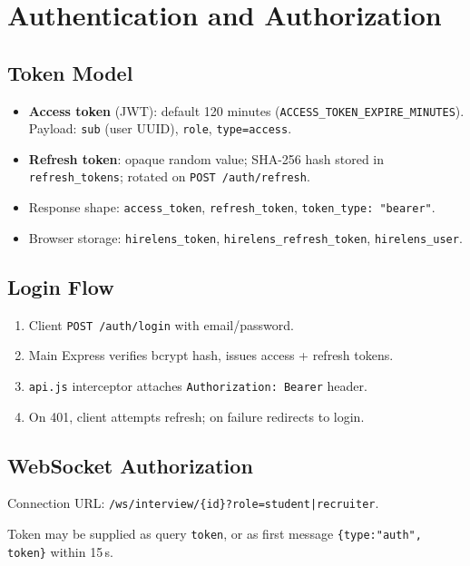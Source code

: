 \documentclass[11pt,a4paper]{report}
\begin{document}
\chapter{Authentication and Authorization}

\section{Token Model}
\begin{itemize}
  \item \textbf{Access token} (JWT): default 120 minutes (\texttt{ACCESS\_TOKEN\_EXPIRE\_MINUTES}). Payload: \texttt{sub} (user UUID), \texttt{role}, \texttt{type=access}.
  \item \textbf{Refresh token}: opaque random value; SHA-256 hash stored in \texttt{refresh\_tokens}; rotated on \texttt{POST /auth/refresh}.
  \item Response shape: \texttt{access\_token}, \texttt{refresh\_token}, \texttt{token\_type: "bearer"}.
  \item Browser storage: \texttt{hirelens\_token}, \texttt{hirelens\_refresh\_token}, \texttt{hirelens\_user}.
\end{itemize}

\section{Login Flow}
\begin{enumerate}
  \item Client \texttt{POST /auth/login} with email/password.
  \item Main Express verifies bcrypt hash, issues access + refresh tokens.
  \item \texttt{api.js} interceptor attaches \texttt{Authorization: Bearer} header.
  \item On 401, client attempts refresh; on failure redirects to login.
\end{enumerate}

\section{WebSocket Authorization}
Connection URL: \texttt{/ws/interview/\{id\}?role=student|recruiter}.

Token may be supplied as query \texttt{token}, or as first message \texttt{\{type:"auth", token\}} within 15\,s.
\end{document}

